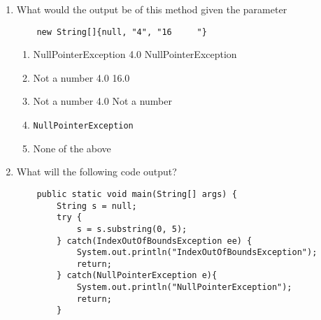 \documentclass[S17-Final.tex]{subfiles}
\begin{document}
\begin{enumerate}
\begin{lstlisting}
    public static void printSquare(String[] nums) throws NullPointerException {
        for(String str : nums) {
            str.replaceAll("\\s+",""); // removes white space
            try {
                System.out.print(Math.pow(Integer.parseInt(str),2) + "\t");
            } catch(NumberFormatException e) {
                System.out.print("Not a number\t");
            }
        }
    }

\end{lstlisting}


	

\item 	What would the output be of this method given the parameter
\begin{lstlisting}
	new String[]{null, "4", "16     "}
\end{lstlisting}
	
\begin{enumerate}
\item  NullPointerException	4.0	NullPointerException
\item  Not a number	4.0	16.0
\item  Not a number	4.0	Not a number	
\item  \texttt{NullPointerException}
\item  None of the above
\end{enumerate}

\item What will the following code output?
\begin{lstlisting}
    public static void main(String[] args) {
        String s = null;
        try {
            s = s.substring(0, 5);
        } catch(IndexOutOfBoundsException ee) {
            System.out.println("IndexOutOfBoundsException");
            return;
        } catch(NullPointerException e){
            System.out.println("NullPointerException");
            return;
        }
        

\end{lstlisting}
\end{enumerate}
\end{document}

